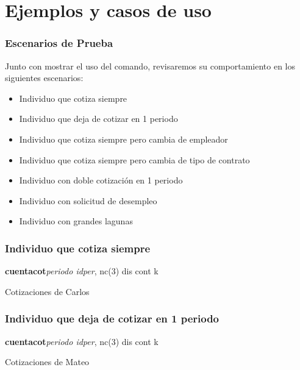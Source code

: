 \documentclass[8pt]{beamer}
\begin{document}
\section{Ejemplos y casos de uso}

\begin{frame}
\frametitle{Escenarios de Prueba}
Junto con mostrar el uso del comando, revisaremos su comportamiento en los siguientes escenarios: \pause
\begin{itemize}[<+->]
\item Individuo que cotiza siempre \hyperlink{caso1}{}
\item Individuo que deja de cotizar en 1 periodo \hyperlink{caso2}{}
\item Individuo que cotiza siempre pero cambia de empleador \hyperlink{caso3}{}
\item Individuo que cotiza siempre pero cambia de tipo de contrato \hyperlink{caso4}{}
\item Individuo con doble cotización en 1 periodo \hyperlink{caso5}{}
\item Individuo con solicitud de desempleo \hyperlink{caso6}{}
\item Individuo con grandes lagunas \hyperlink{caso7}{}
\end{itemize}
\hypertarget<8>{escenarios}{}
\end{frame}

\begin{frame}[fragile, label=caso1]
\frametitle{Individuo que cotiza siempre}

\begin{semiverbatim}
{\bf cuentacot}{\it periodo idper}, nc({\color{blue}3}) {\color{blue}dis cont k}
\end{semiverbatim}
\pause
\begin{table}
\caption{Cotizaciones de Carlos}
\scalebox{.6}{

}
\end{table}
\hyperlink{escenarios}{}
\end{frame}

\begin{frame}[fragile, label=caso2]
\frametitle{Individuo que deja de cotizar en 1 periodo}

\begin{semiverbatim}
{\bf cuentacot}{\it periodo idper}, nc({\color{blue}3}) {\color{blue}dis cont k}
\end{semiverbatim}
\pause
\begin{table}
\caption{Cotizaciones de Mateo}
\scalebox{.6}{

}
\end{table}
\hyperlink{escenarios}{}
\end{frame}
\end{document}
